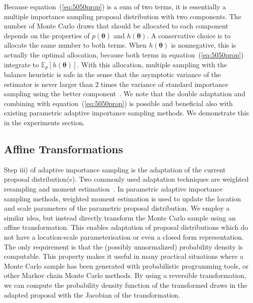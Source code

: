 \documentclass[12pt]{article}
\begin{document}
Because equation~(\ref{eq:5050prop}) is a sum of two terms, it is essentially a multiple
importance sampling proposal distribution with two components.
The number of Monte Carlo draws that should be allocated to each component
depends on the properties of $p(\boldsymbol{\theta})$ and $h(\boldsymbol{\theta})$.
A conservative choice is to allocate the same number to both terms.
When $h(\boldsymbol{\theta})$ is nonnegative, this is actually the optimal allocation, because
both terms in equation~(\ref{eq:5050prop}) integrate to $\mathbb{E}_p [h(\boldsymbol{\theta})]$.
With this allocation, 
multiple sampling with the balance heuristic is safe in the sense that the asymptotic variance of the
estimator is never larger than $2$ times the variance of
standard importance sampling using
the better component~\citep{he2014optimal}.
We note that the double adaptation and combining with equation~(\ref{eq:5050prop}) is possible
and beneficial
also with existing parametric adaptive importance sampling methods.
We demonstrate this in the experiments section.











\subsection{Affine Transformations}





Step iii) of adaptive importance sampling is the adaptation of the current proposal distribution(s).
Two commonly used adaptation techniques are weighted resampling and moment estimation~\citep{bugallo2017adaptive}.
In parametric adaptive importance sampling methods, weighted moment estimation is used
to update the location and scale parameters of the parametric proposal distribution.
We employ a similar idea, but instead directly transform the Monte Carlo sample
using an affine transformation.
This enables adaptation of proposal
distributions which do not have a location-scale parameterisation or even a
closed form representation. The only requirement is that
the (possibly unnormalized) probability density is computable.
This property makes it
useful in many practical situations
where a Monte Carlo sample has been generated with probabilistic programming
tools, or other Markov chain Monte Carlo methods.
By using a reversible transformation,
we can compute the probability density function of the transformed draws
in the adapted proposal with the Jacobian
of the transformation.
%
%
%
%
%
%
%
%
%
%
%
%
%
\end{document}
